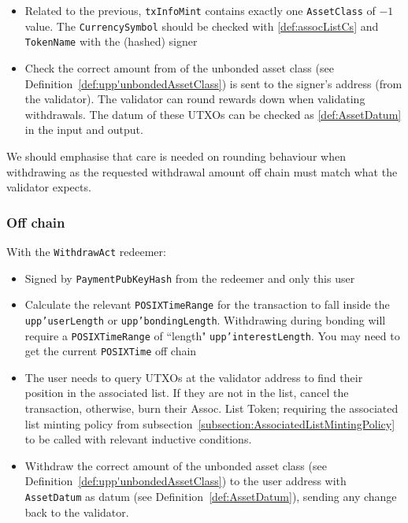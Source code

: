 \documentclass[10pt, a4paper]{article}
\theoremstyle{definition}
\begin{document}
\begin{itemize}
{\begin{enumerate}
{with $f$ as before. These are rewards for the last completed bonding cycle that should not include any recent deposits whilst open.}
\end{enumerate}

 If the NFT State UTXO is spent (as part of \textbf{open withdrawal} induction), it must be sent back to the validator also, potentially altered by head withdrawal. The on-chain associated should be correctly updated as part of the inductive conditions.
 
To make withdrawals flexible, we can bound the allowed withdrawal amount to be  $\texttt{deposited} \leq \texttt{withdrawalAmount} \leq \texttt{deposited} + \texttt{(updated)Rewards}$ (per user) to prevent insufficient fund issues stopping a deposit withdrawal atleast.
 }
\item{Related to the previous, \texttt{txInfoMint} contains exactly one \texttt{AssetClass} of $-1$ value. The \texttt{CurrencySymbol} should be checked with \ref{def:assocListCs} and \texttt{TokenName} with the (hashed) signer}
\item{Check the correct amount from of the unbonded asset class (see Definition~\ref{def:upp'unbondedAssetClass}) is sent to the signer's address (from the validator). The validator can round rewards down when validating withdrawals. The datum of these UTXOs can be checked as \ref{def:AssetDatum} in the input and output.} 
\end{itemize}
We should emphasise that care is needed on rounding behaviour when withdrawing as the requested withdrawal amount off chain must match what the validator expects.


\subsubsection{Off chain}\label{subsection:UserWithdrawOffchain}
With the \texttt{WithdrawAct} redeemer:
\begin{itemize}
\item{Signed by \texttt{PaymentPubKeyHash} from the redeemer and only this user}
\item{Calculate the relevant \texttt{POSIXTimeRange} for the transaction to fall inside the \texttt{upp'userLength} or \texttt{upp'bondingLength}. Withdrawing during bonding will require a \texttt{POSIXTimeRange} of ``length"  \texttt{upp'interestLength}. You may need to get the current \texttt{POSIXTime} off chain}
\item{The user needs to query UTXOs at the validator address to find their position in the associated list. If they are not in the list, cancel the transaction, otherwise, burn their Assoc. List Token; requiring the associated list minting policy from subsection~\ref{subsection:AssociatedListMintingPolicy} to be called with relevant inductive conditions.}
\item{Withdraw the correct amount of the unbonded asset class (see Definition~\ref{def:upp'unbondedAssetClass}) to the user address with \texttt{AssetDatum} as datum (see Definition~\ref{def:AssetDatum}), sending any change back to the validator.}
\end{itemize}
\end{document}
